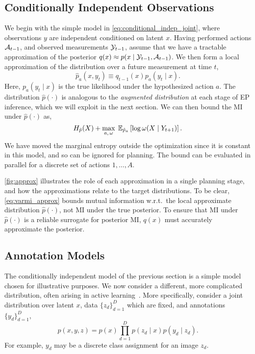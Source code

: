 \subsection{Conditionally Independent Observations}

We begin with the simple model in
\EQN\ref{eq:conditional_indep_joint}, where observations $y$ are
independent conditioned on latent $x$.  Having performed actions
$\mathcal{A}_{t-1}$, and observed measurements $\mathcal{Y}_{t-1}$, assume that we
have a tractable approximation of the posterior \mbox{$q(x) \approx
  p(x \mid \mathcal{Y}_{t-1}, \mathcal{A}_{t-1})$}.  We then form a local
approximation of the distribution over a future measurement at time
$t$,
\begin{equation}\label{eq:local_approx}
  \hat{p}_{a}(x,y_t) \equiv q_{t-1}(x) p_{a}(y_t \mid x).
\end{equation}
Here, $p_{a}(y_t \mid x)$ is the true likelihood under the
hypothesized action $a$.  The distribution $\hat{p}(\cdot)$ is
analogous to the \emph{augmented distribution} at each stage of EP
inference, which we will exploit in the next section.  We can then
bound the MI under $\hat{p}(\cdot)$ as,
\begin{equation}\label{eq:varmi_approx}
  H_{\hat{p}}(X) + \max_{a, \,\omega}  \;\mathbb{E}_{\hat{p}_a}\left[ \log \omega(X \mid Y_{t+1})
  \right].
\end{equation}
We have moved the marginal entropy outside the optimization since it is
constant in this model, and so can be ignored for planning.  The bound
can be evaluated in parallel for a discrete set of actions
$1,\ldots,A$.

\FIG\ref{fig:approx} illustrates the role of each approximation in a
single planning stage, and how the approximations relate to the target
distributions.  To be clear, \EQN\eqref{eq:varmi_approx} bounds mutual
information w.r.t.~the local approximate distribution
$\hat{p}(\cdot)$, not MI under the true posterior.  To ensure that MI
under $\hat{p}(\cdot)$ is a reliable surrogate for posterior MI,
$q(x)$ must accurately approximate the posterior.

\subsection{Annotation Models}

The conditionally independent model of the previous section is a
simple model chosen for illustrative purposes.  We now consider a
different, more complicated distribution, often arising in active
learning~\citep{settles2012active}.  More specifically, consider a
joint distribution over latent $x$, data $\{z_d\}_{d=1}^D$ which are
fixed, and annotations $\{y_d\}_{d=1}^D$,
\[
  p(x,y,z) = p(x) \prod_{d=1}^D p(z_d \mid x) p(y_d \mid z_d). 
\]
For example, $y_d$ may be a discrete class assignment for an image
$z_d$.  

